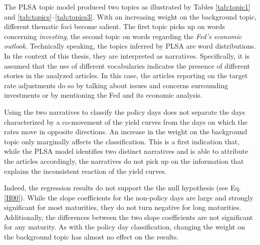 \documentclass[11pt,a4paper,english,oneside]{book}
\numberwithin{equation}{chapter}
\begin{document}
The PLSA topic model produced two topics as illustrated by Tables \ref{tab:topic1} and \ref{tab:topics}--\ref{tab:topics3}. With an increasing weight on the background topic, different thematic foci become salient. The first topic picks up on words concerning \textit{investing}, the second topic on words regarding the \textit{Fed's economic outlook}. Technically speaking, the topics inferred by PLSA are word distributions. In the context of this thesis, they are interpreted as narratives. Specifically, it is assumed that the use of different vocabularies indicates the presence of different stories in the analyzed articles. In this case, the articles reporting on the target rate adjustments do so by talking about issues and concerns surrounding investments or by mentioning the Fed and its economic analysis. 

Using the two narratives to classify the policy days does not separate the days characterized by a co-movement of the yield curves from the days on which the rates move in opposite directions. An increase in the weight on the background topic only marginally affects the classification. This is a first indication that, while the PLSA model identifies two distinct narratives and is able to attribute the articles accordingly, the narratives do not pick up on the information that explains the inconsistent reaction of the yield curves.

Indeed, the regression results do not support the the null hypothesis (see Eq. \ref{H00}). While the slope coefficients for the non-policy days are large and strongly significant for most maturities, they do not turn negative for long maturities. Additionally, the differences between the two slope coefficients are not significant for any maturity. As with the policy day classification, changing the weight on the background topic has almost no effect on the results. 
\end{document}
